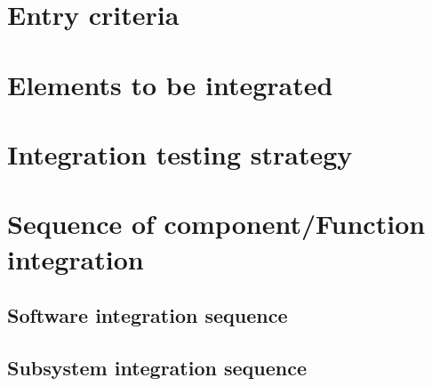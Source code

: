 \section{Entry criteria}

\section{Elements to be integrated}

\section{Integration testing strategy}

\section{Sequence of component/Function integration}

\subsection{Software integration sequence}

\subsection{Subsystem integration sequence}
